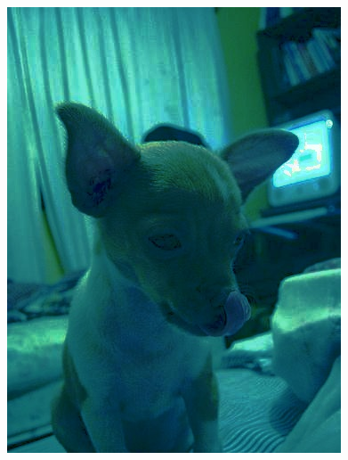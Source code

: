 \begin{appendices}
\begin{figure}[htb]
\begin{minipage}{0.19\textwidth}
\end{minipage}
\begin{minipage}{0.19\textwidth}
\includegraphics[width=.8\textwidth]{images/anomalien/HS/n02085620_2188.jpg}
\end{minipage}
\begin{minipage}{0.19\textwidth}

\end{minipage}
\end{figure}
\end{appendices}
